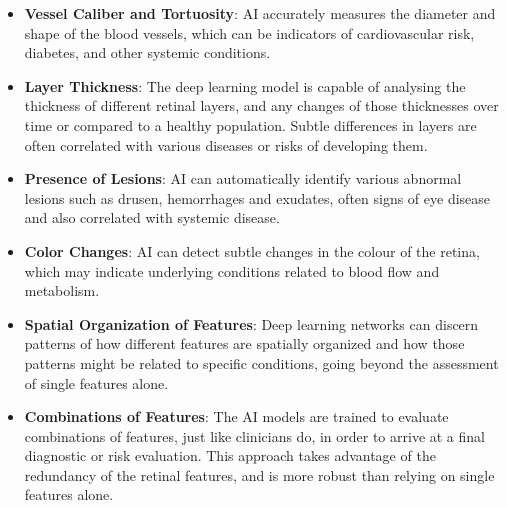\documentclass[
  Letterpaper,
]{scrbook}
\begin{document}
\begin{itemize}
\item
  \textbf{Vessel Caliber and Tortuosity}: AI accurately measures the
  diameter and shape of the blood vessels, which can be indicators of
  cardiovascular risk, diabetes, and other systemic conditions.
\item
  \textbf{Layer Thickness}: The deep learning model is capable of
  analysing the thickness of different retinal layers, and any changes
  of those thicknesses over time or compared to a healthy population.
  Subtle differences in layers are often correlated with various
  diseases or risks of developing them.
\item
  \textbf{Presence of Lesions}: AI can automatically identify various
  abnormal lesions such as drusen, hemorrhages and exudates, often signs
  of eye disease and also correlated with systemic disease.
\item
  \textbf{Color Changes}: AI can detect subtle changes in the colour of
  the retina, which may indicate underlying conditions related to blood
  flow and metabolism.
\item
  \textbf{Spatial Organization of Features}: Deep learning networks can
  discern patterns of how different features are spatially organized and
  how those patterns might be related to specific conditions, going
  beyond the assessment of single features alone.
\item
  \textbf{Combinations of Features}: The AI models are trained to
  evaluate combinations of features, just like clinicians do, in order
  to arrive at a final diagnostic or risk evaluation. This approach
  takes advantage of the redundancy of the retinal features, and is more
  robust than relying on single features alone.
\end{itemize}
\end{document}
